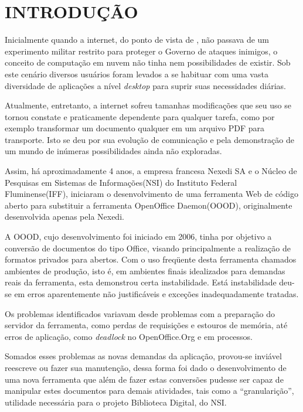 \chapter{INTRODUÇÃO}
\thispagestyle{empty}

Inicialmente quando a internet, do ponto de vista de \cite{TESLA}, não passava de um experimento militar restrito para proteger o Governo de ataques inimigos, o conceito de computação em nuvem não tinha nem possibilidades de existir. Sob este cenário diversos usuários foram levados a se habituar com uma vasta diversidade de aplicações a nível \textit{desktop} para suprir suas necessidades diárias.

Atualmente, entretanto, a internet sofreu tamanhas modificações que seu uso se tornou constate e praticamente dependente para qualquer tarefa, como por exemplo transformar um documento qualquer em um arquivo PDF para transporte. Isto se deu por sua evolução de comunicação e pela demonstração de um mundo de inúmeras possibilidades ainda não exploradas.

Assim, há aproximadamente 4 anos, a empresa francesa Nexedi SA e o Núcleo de Pesquisas em Sistemas de Informações(NSI) do Instituto Federal Fluminense(IFF), iniciaram o desenvolvimento de uma ferramenta Web de código aberto para substituir a ferramenta OpenOffice Daemon(OOOD), originalmente desenvolvida apenas pela Nexedi.

A OOOD, cujo desenvolvimento foi iniciado em 2006, tinha por objetivo a conversão de documentos do tipo Office, visando principalmente a realização de formatos privados para abertos. Com o uso freqüente desta ferramenta chamados ambientes de produção, isto é, em ambientes finais idealizados para demandas reais da ferramenta, esta demonstrou certa instabilidade. Está instabilidade deu-se em erros aparentemente não justificáveis e exceções inadequadamente tratadas.

Os problemas identificados variavam desde problemas com a preparação do servidor da ferramenta, como perdas de requisições e estouros de memória, até erros de aplicação, como \textit{deadlock} no OpenOffice.Org e em processos.

Somados esses problemas as novas demandas da aplicação, provou-se inviável reescreve ou fazer sua manutenção, dessa forma foi dado o desenvolvimento de uma nova ferramenta que além de fazer estas conversões pudesse ser capaz de manipular estes documentos para demais atividades, tais como a ``granularição'', utilidade necessária para o projeto Biblioteca Digital, do NSI.

